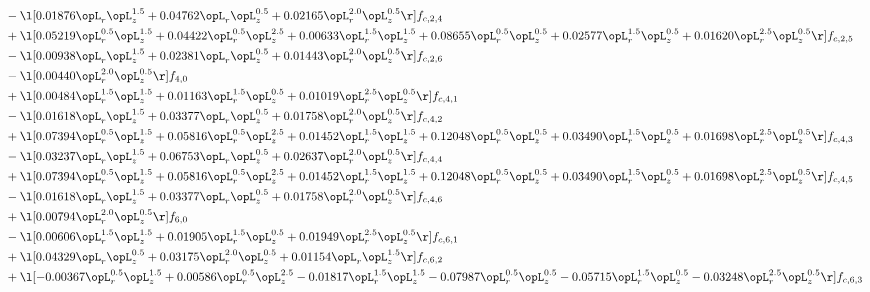 \begin{alignat}{2}
& - \l[  0.01876 \opL_r \opL_z^{1.5} +  0.04762 \opL_r \opL_z^{0.5} +  0.02165 \opL_r^{2.0} \opL_z^{0.5}  \r] f_{c,2,4} \nonumber \\ 
& + \l[  0.05219 \opL_r^{0.5} \opL_z^{1.5} +  0.04422 \opL_r^{0.5} \opL_z^{2.5} +  0.00633 \opL_r^{1.5} \opL_z^{1.5} +  0.08655 \opL_r^{0.5} \opL_z^{0.5} +  0.02577 \opL_r^{1.5} \opL_z^{0.5} +  0.01620 \opL_r^{2.5} \opL_z^{0.5}  \r] f_{c,2,5} \nonumber \\ 
& - \l[  0.00938 \opL_r \opL_z^{1.5} +  0.02381 \opL_r \opL_z^{0.5} +  0.01443 \opL_r^{2.0} \opL_z^{0.5}  \r] f_{c,2,6} \nonumber \\ 
& - \l[  0.00440 \opL_r^{2.0} \opL_z^{0.5}  \r] f_{4,0} \nonumber \\ 
& + \l[  0.00484 \opL_r^{1.5} \opL_z^{1.5} +  0.01163 \opL_r^{1.5} \opL_z^{0.5} +  0.01019 \opL_r^{2.5} \opL_z^{0.5}  \r] f_{c,4,1} \nonumber \\ 
& - \l[  0.01618 \opL_r \opL_z^{1.5} +  0.03377 \opL_r \opL_z^{0.5} +  0.01758 \opL_r^{2.0} \opL_z^{0.5}  \r] f_{c,4,2} \nonumber \\ 
& + \l[  0.07394 \opL_r^{0.5} \opL_z^{1.5} +  0.05816 \opL_r^{0.5} \opL_z^{2.5} +  0.01452 \opL_r^{1.5} \opL_z^{1.5} +  0.12048 \opL_r^{0.5} \opL_z^{0.5} +  0.03490 \opL_r^{1.5} \opL_z^{0.5} +  0.01698 \opL_r^{2.5} \opL_z^{0.5}  \r] f_{c,4,3} \nonumber \\ 
& - \l[  0.03237 \opL_r \opL_z^{1.5} +  0.06753 \opL_r \opL_z^{0.5} +  0.02637 \opL_r^{2.0} \opL_z^{0.5}  \r] f_{c,4,4} \nonumber \\ 
& + \l[  0.07394 \opL_r^{0.5} \opL_z^{1.5} +  0.05816 \opL_r^{0.5} \opL_z^{2.5} +  0.01452 \opL_r^{1.5} \opL_z^{1.5} +  0.12048 \opL_r^{0.5} \opL_z^{0.5} +  0.03490 \opL_r^{1.5} \opL_z^{0.5} +  0.01698 \opL_r^{2.5} \opL_z^{0.5}  \r] f_{c,4,5} \nonumber \\ 
& - \l[  0.01618 \opL_r \opL_z^{1.5} +  0.03377 \opL_r \opL_z^{0.5} +  0.01758 \opL_r^{2.0} \opL_z^{0.5}  \r] f_{c,4,6} \nonumber \\ 
& + \l[  0.00794 \opL_r^{2.0} \opL_z^{0.5}  \r] f_{6,0} \nonumber \\ 
& - \l[  0.00606 \opL_r^{1.5} \opL_z^{1.5} +  0.01905 \opL_r^{1.5} \opL_z^{0.5} +  0.01949 \opL_r^{2.5} \opL_z^{0.5}  \r] f_{c,6,1} \nonumber \\ 
& + \l[  0.04329 \opL_r \opL_z^{0.5} +  0.03175 \opL_r^{2.0} \opL_z^{0.5} +  0.01154 \opL_r \opL_z^{1.5}  \r] f_{c,6,2} \nonumber \\ 
& + \l[  -0.00367 \opL_r^{0.5} \opL_z^{1.5} +  0.00586 \opL_r^{0.5} \opL_z^{2.5}   -0.01817 \opL_r^{1.5} \opL_z^{1.5}   -0.07987 \opL_r^{0.5} \opL_z^{0.5}   -0.05715 \opL_r^{1.5} \opL_z^{0.5}   -0.03248 \opL_r^{2.5} \opL_z^{0.5}  \r] f_{c,6,3} \nonumber \\ 

\end{alignat}
